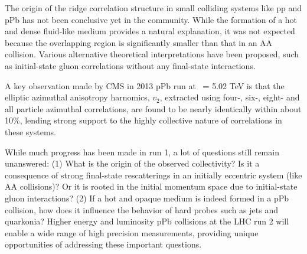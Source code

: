 The origin of the ridge correlation structure in small colliding systems like pp and pPb
has not been conclusive yet in the community. While the formation of a hot and dense fluid-like
medium provides a natural explanation, it was not expected because the overlapping region 
is significantly smaller than that in an AA collision. Various alternative theoretical interpretations
have been proposed, such as initial-state gluon correlations without any final-state interactions.

A key observation made by CMS in 2013 pPb run at \rootsNN\ = 5.02 TeV is that
the elliptic azimuthal anisotropy harnomics, $v_2$, extracted using four-, six-,
eight- and all particle azimuthal correlations, are found to be nearly identically
within about 10\%, lending strong support to the highly collective nature of correlations 
in these systems. 

While much progress has been made in run 1, a lot of questions still remain unanswered: (1)
What is the origin of the observed collectivity? Is it a consequence of strong final-state
rescatterings in an initially eccentric system (like AA collisions)? Or it is rooted
in the initial momentum space due to initial-state gluon interactions? (2) If a hot and opaque 
medium is indeed formed in a pPb collision, how does it influence the behavior of hard probes
such as jets and quarkonia? Higher energy and luminosity pPb collisions at the LHC run 2 
will enable a wide range of high precision measurements, providing unique opportunities 
of addressing these important questions. 